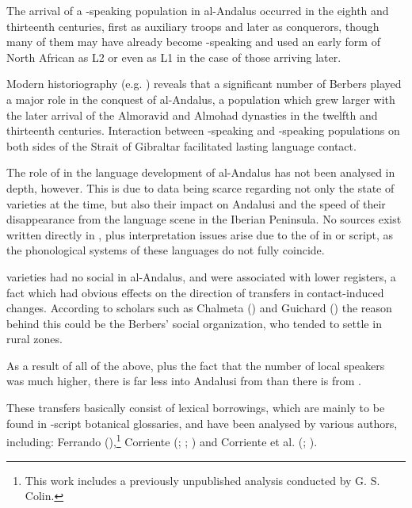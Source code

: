 \documentclass[output=paper,modfonts,nonflat]{langsci/langscibook}
\begin{document}
The arrival of a -speaking population in al-Andalus occurred in the eighth and thirteenth centuries, first as auxiliary troops and later as conquerors, though many of them may have already become -speaking and used an early form of North African  as L2 or even as L1 in the case of those arriving later. 

Modern historiography (e.g. \citealt{ManzanoMoreno1990,Guichard1995,Chalmeta2003}) reveals that a significant number of Berbers played a major role in the conquest of al-Andalus, a population which grew larger with the later arrival of the Almoravid and Almohad dynasties in the twelfth and thirteenth centuries. Interaction between -speaking and -speaking populations on both sides of the Strait of Gibraltar facilitated lasting language contact. 

The role of  in the language development of al-Andalus has not been analysed in depth, however. This is due to data being scarce regarding not only the state of  varieties at the time, but also their impact on Andalusi  and the speed of their disappearance from the language scene in the Iberian Peninsula. No sources exist written directly in , plus interpretation issues arise due to the  of   in  or  script, as the phonological systems of these languages do not fully coincide.  

 varieties had no social  in al-Andalus, and were associated with lower registers, a fact which had obvious effects on the direction of transfers in contact-induced changes. According to scholars such as Chalmeta (\citeyear[160]{Chalmeta2003}) and Guichard (\citeyear{Guichard1995}) the reason behind this could be the Berbers’ social organization, who tended to settle in rural zones. 

As a result of all of the above, plus the fact that the number of local  speakers was much higher, there is far less  into Andalusi  from  than there is from . 

These transfers basically consist of lexical borrowings, which are mainly to be found in -script botanical glossaries,  and have been analysed by various authors, including: Ferrando (\citeyear{Ferrando1997}),\footnote{This work includes a previously unpublished analysis conducted by G. S. Colin.} Corriente (\citeyear{Corriente1981}; \citeyear{Corriente1998Berber}; \citeyear{Corriente2002}) and Corriente et al. (\citeyear{CorrientePereiraVicente2017}; \citeyear{CorrientePereiraVicenteforthcoming}).
\end{document}
